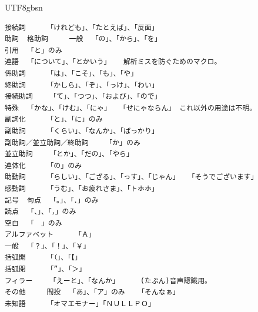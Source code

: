 \documentclass[12pt]{book} %
\begin{document}
\begin{CJK}{UTF8}{gbsn}
\begin{verbatim}
接続詞 	「けれども」、「たとえば」、「反面」 	
助詞 	格助詞 	一般 	「の」、「から」、「を」 	
引用 	「と」のみ 	
連語 	「について」、「とかいう」 	解析ミスを防ぐためのマクロ。
係助詞 	「は」、「こそ」、「も」、「や」 	
終助詞 	「かしら」、「ぞ」、「っけ」、「わい」 	
接続助詞 	「て」、「つつ」、「および」、「ので」 	
特殊 	「かな」、「けむ」、「にゃ」 	「せにゃならん」 これ以外の用途は不明。
副詞化 	「と」、「に」のみ 	
副助詞 	「くらい」、「なんか」、「ばっかり」 	
副助詞／並立助詞／終助詞 	「か」のみ 	
並立助詞 	「とか」、「だの」、「やら」 	
連体化 	「の」のみ 	
助動詞 	「らしい」、「ござる」、「っす」、「じゃん」 	「そうでございます」
感動詞 	「うむ」、「お疲れさま」、「トホホ」 	
記号 	句点 	「。」、「．」のみ 	
読点 	「、」、「，」のみ 	
空白 	「　」のみ 	
アルファベット 	「Ａ」 	
一般 	「？」、「！」、「￥」 	
括弧開 	「（」、「【」 	
括弧閉 	「”」、「＞」 	
フィラー 	「えーと」、「なんか」 	(たぶん)音声認識用。
その他 	間投 	「あ」、「ア」のみ 	「そんなぁ」
未知語 	「オマエモナー」「ＮＵＬＬＰＯ」 	
\end{verbatim}




\end{CJK}
\end{document}
